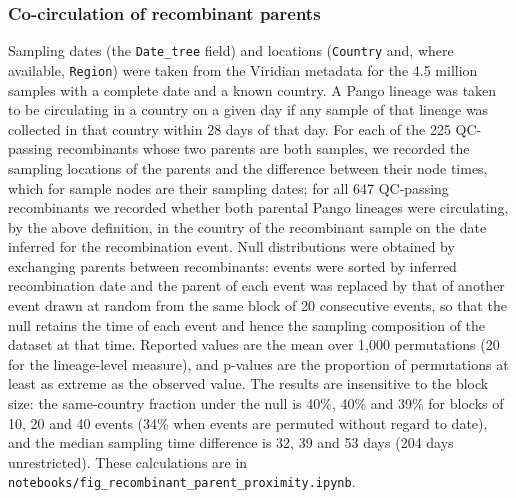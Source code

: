 \documentclass[12pt]{article}
\begin{document}
\subsubsection*{Co-circulation of recombinant parents}
Sampling dates (the \texttt{Date\_tree} field) and locations
(\texttt{Country} and, where available, \texttt{Region})
were taken from the Viridian metadata for the 4.5 million samples
with a complete date and a known country.
A Pango lineage was taken to be circulating in a country on a given day
if any sample of that lineage was collected in that country
within 28 days of that day.
For each of the 225 QC-passing recombinants
whose two parents are both samples,
we recorded the sampling locations of the parents
and the difference between their node times,
which for sample nodes are their sampling dates;
for all 647 QC-passing recombinants we recorded whether
both parental Pango lineages were circulating,
by the above definition, in the country of the recombinant sample
on the date inferred for the recombination event.
Null distributions were obtained by exchanging parents between recombinants:
events were sorted by inferred recombination date
and the parent of each event was replaced by that of another event
drawn at random from the same block of 20 consecutive events,
so that the null retains the time of each event
and hence the sampling composition of the dataset at that time.
Reported values are the mean over 1,000 permutations
(20 for the lineage-level measure),
and p-values are the proportion of permutations
at least as extreme as the observed value.
The results are insensitive to the block size:
the same-country fraction under the null is
40\%, 40\% and 39\% for blocks of 10, 20 and 40 events
(34\% when events are permuted without regard to date),
and the median sampling time difference is
32, 39 and 53 days (204 days unrestricted).
These calculations are in
\texttt{notebooks/fig\_recombinant\_parent\_proximity.ipynb}.
\end{document}
